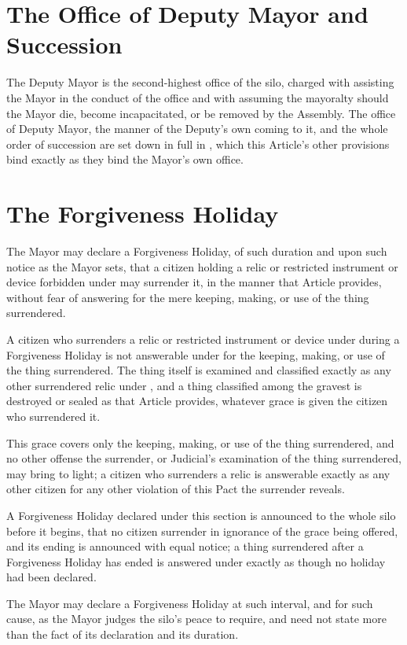 \section{The Office of Deputy Mayor and Succession}
\label{sec:mayor:office-of-deputy-mayor-and-succession}

The Deputy Mayor is the second-highest office of the silo, charged with assisting the Mayor in the conduct of the office and with assuming the mayoralty should the Mayor die, become incapacitated, or be removed by the Assembly. The office of Deputy Mayor, the manner of the Deputy's own coming to it, and the whole order of succession are set down in full in , which this Article's other provisions bind exactly as they bind the Mayor's own office.

\section{The Forgiveness Holiday}
\label{sec:mayor:forgiveness-holiday}

The Mayor may declare a Forgiveness Holiday, of such duration and upon such notice as the Mayor sets, that a citizen holding a relic or restricted instrument or device forbidden under  may surrender it, in the manner that Article provides, without fear of answering for the mere keeping, making, or use of the thing surrendered.

\begin{clauses}
\item A citizen who surrenders a relic or restricted instrument or device under  during a Forgiveness Holiday is not answerable under  for the keeping, making, or use of the thing surrendered. The thing itself is examined and classified exactly as any other surrendered relic under , and a thing classified among the gravest is destroyed or sealed as that Article provides, whatever grace is given the citizen who surrendered it.
\item This grace covers only the keeping, making, or use of the thing surrendered, and no other offense the surrender, or Judicial's examination of the thing surrendered, may bring to light; a citizen who surrenders a relic is answerable exactly as any other citizen for any other violation of this Pact the surrender reveals.
\item A Forgiveness Holiday declared under this section is announced to the whole silo before it begins, that no citizen surrender in ignorance of the grace being offered, and its ending is announced with equal notice; a thing surrendered after a Forgiveness Holiday has ended is answered under  exactly as though no holiday had been declared.
\item The Mayor may declare a Forgiveness Holiday at such interval, and for such cause, as the Mayor judges the silo's peace to require, and need not state more than the fact of its declaration and its duration.
\end{clauses}


